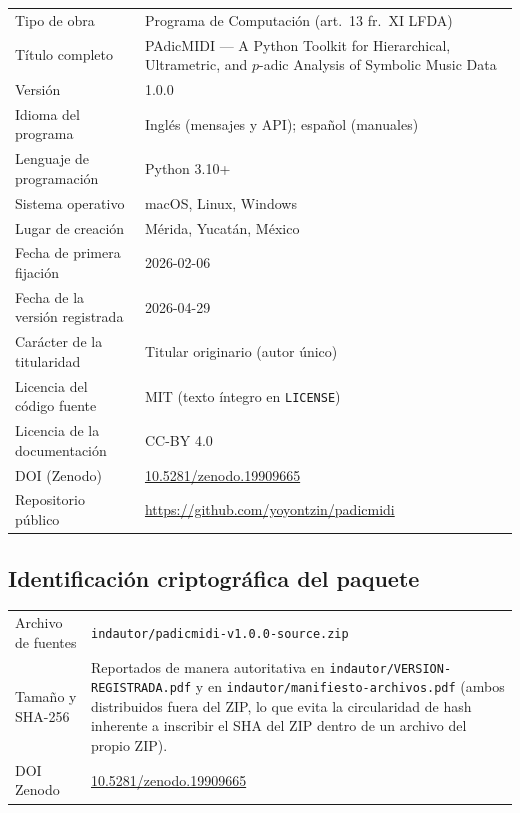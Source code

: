\documentclass[11pt,a4paper,oneside]{article}
\theoremstyle{plain}
\theoremstyle{definition}
\theoremstyle{remark}
\newcommand{\code}[1]{\texttt{\small #1}}
\begin{document}
\begin{tabularx}{\linewidth}{lX}
  \toprule
  Tipo de obra & Programa de Computación (art.\ 13 fr.\ XI LFDA) \\
  Título completo & PAdicMIDI --- A Python Toolkit for Hierarchical, Ultrametric, and $p$-adic Analysis of Symbolic Music Data \\
  Versión & 1.0.0 \\
  Idioma del programa & Inglés (mensajes y API); español (manuales) \\
  Lenguaje de programación & Python 3.10+ \\
  Sistema operativo & macOS, Linux, Windows \\
  Lugar de creación & Mérida, Yucatán, México \\
  Fecha de primera fijación & 2026-02-06 \\
  Fecha de la versión registrada & 2026-04-29 \\
  Carácter de la titularidad & Titular originario (autor único) \\
  Licencia del código fuente & MIT (texto íntegro en \code{LICENSE}) \\
  Licencia de la documentación & CC-BY 4.0 \\
  DOI (Zenodo) & \href{https://doi.org/10.5281/zenodo.19909665}{10.5281/zenodo.19909665} \\
  Repositorio público & \url{https://github.com/yoyontzin/padicmidi} \\
  \bottomrule
\end{tabularx}

\subsection{Identificación criptográfica del paquete}

\begin{tabularx}{\linewidth}{lX}
  \toprule
  Archivo de fuentes & \code{indautor/padicmidi-v1.0.0-source.zip} \\
  Tamaño y SHA-256   & Reportados de manera autoritativa en
                       \code{indautor/VERSION-REGISTRADA.pdf} y en
                       \code{indautor/manifiesto-archivos.pdf} (ambos
                       distribuidos fuera del ZIP, lo que evita la
                       circularidad de hash inherente a inscribir el SHA
                       del ZIP dentro de un archivo del propio ZIP). \\
  DOI Zenodo         & \href{https://doi.org/10.5281/zenodo.19909665}{10.5281/zenodo.19909665} \\
  \bottomrule
\end{tabularx}
\end{document}
